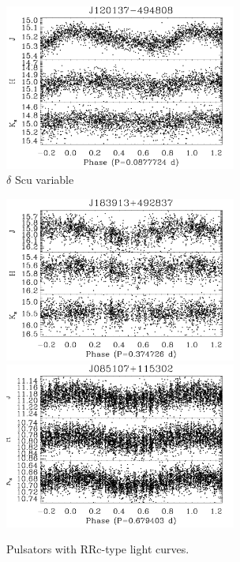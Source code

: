 \documentclass[]{emulateapj}
\begin{document}
\begin{figure}[]
\centering
\includegraphics[width=3.0in]{new_plots/rr_0}
\caption{$\delta$ Scu variable}
\label{rrshort}
\end{figure}


\begin{figure}[]
\centering
\includegraphics[width=3.0in]{new_plots/rr_1}
\includegraphics[width=3.0in]{new_plots/rr_8}
\caption{Pulsators with RRc-type light curves.}
\label{rrc}
\end{figure}
\end{document}
